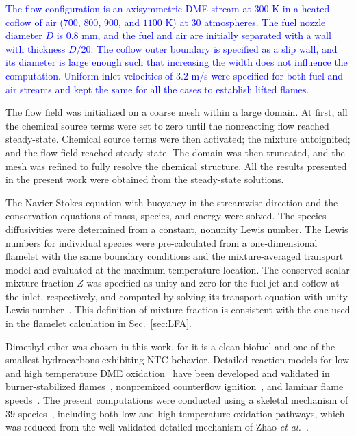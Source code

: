 \documentclass[review,3p,times]{elsarticle}
\begin{document}
\textcolor{blue}{The flow configuration is an axisymmetric DME stream at $300$ K in a heated coflow of air ($700$, $800$, $900$, and $1100$ K) at $30$ atmospheres.  The fuel nozzle diameter $D$ is $0.8$ mm, and the fuel and air are initially separated with a wall with thickness $D/20$.  The coflow outer boundary is specified as a slip wall, and its diameter is large enough such that increasing the width does not influence the computation.  Uniform inlet velocities of $3.2$ m/s were specified for both fuel and air streams and kept the same for all the cases to establish lifted flames.}

The flow field was initialized on a coarse mesh within a large domain.  At first, all the chemical source terms were set to zero until the nonreacting  flow reached steady-state.  Chemical source terms were then activated; the mixture autoignited; and the flow field reached steady-state.  The domain was then truncated, and the mesh was refined to fully resolve the chemical structure.  All the results presented in the present work were obtained from the steady-state solutions.  

The Navier-Stokes equation with buoyancy in the streamwise direction and the conservation equations of mass, species, and energy were solved.  The species diffusivities were determined from a constant, nonunity Lewis number.  The Lewis numbers for individual species were pre-calculated from a one-dimensional flamelet with the same boundary conditions and the mixture-averaged transport model and evaluated at the maximum temperature location.  The conserved scalar mixture fraction $Z$ was specified as unity and zero for the fuel jet and coflow at the inlet, respectively, and computed by solving its transport equation with unity Lewis number~\cite{pitsch98b}.  This definition of mixture fraction is consistent with the one used in the flamelet calculation in Sec.~\ref{sec:LFA}.

Dimethyl ether was chosen in this work, for it is a clean biofuel and one of the smallest hydrocarbons exhibiting NTC behavior. Detailed reaction models for low and high temperature DME oxidation~\cite{curran98,fischer00,curran00,zhao08} have been developed and validated in burner-stabilized flames~\cite{kaiser00}, nonpremixed counterflow ignition~\cite{zheng05}, and laminar flame speeds~\cite{qin05}.  The present computations were conducted using a skeletal mechanism of $39$ species~\cite{bhagatwala15}, including both low and high temperature oxidation pathways, which was reduced from the well validated detailed mechanism of Zhao \emph{et al.}~\cite{zhao08}. 
\end{document}
